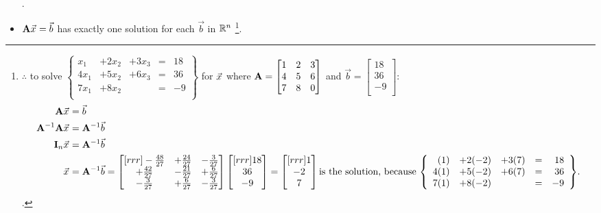 \documentclass{article}%
\begin{document}
\begin{multicols}{2}
\begin{itemize}
{\begin{align}
\end{align}}.
  \item $\matA\vecx = \vec{b}$ has exactly one solution for each $\vec{b}$ in $\mathbb{R}^{n}$ \footnote{$\therefore$ to solve 
$\left\{ \begin{array}{rrrlr} x_1 &+2x_2 &+3x_3 &=& 18 \\ 4x_1 &+5x_2 &+6x_3 &=& 36 \\ 7x_1 &+8x_2 &&=& -9 \\ \end{array} \right\}$ for $\vecx$ where $\mathbf{A} = \begin{bmatrix} 1& 2& 3\\ 4& 5& 6\\ 7& 8& 0\\ \end{bmatrix}$ and $\vec{b} = \begin{bmatrix} 18 \\ 36 \\ -9 \\ \end{bmatrix}$:
\begin{align} \matA\vecx &= \vec{b} \\
\matA^{-1}\matA\vecx &= \matA^{-1}\vec{b} \\
\matI_{n}\vecx &= \matA^{-1}\vec{b} \\
\vecx &= \matA^{-1} \vec{b} = 
\begin{bmatrix}[rrr]
-\frac{48}{27}& +\frac{24}{27}& -\frac{3}{27}\\ +\frac{42}{27}& -\frac{21}{27}& +\frac{6}{27}\\ -\frac{3}{27}& +\frac{6}{27}& -\frac{3}{27}\\
\end{bmatrix} \begin{bmatrix}[rrr] 18\\36\\-9 \\ \end{bmatrix} = \begin{bmatrix}[rrr] 1 \\ -2 \\ 7 \\ \end{bmatrix} \text{is the solution, because $\left\{ \begin{array}{rrrlr} (1) &+2(-2) &+3(7) &=& 18 \\ 4(1) &+5(-2) &+6(7) &=& 36 \\ 7(1) &+8(-2) &&=& -9 \\ \end{array} \right\}$}.
\end{align}.}.
\end{itemize}


\end{multicols}
\end{document}
